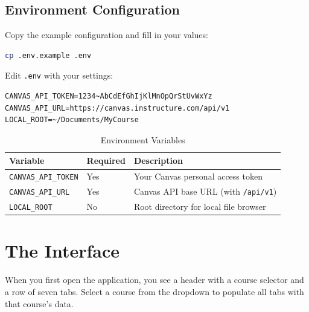 \documentclass[12pt,letterpaper]{article}
\begin{document}
\subsection{Environment Configuration}

Copy the example configuration and fill in your values:

\begin{lstlisting}[language=bash]
cp .env.example .env
\end{lstlisting}

Edit \texttt{.env} with your settings:

\begin{lstlisting}
CANVAS_API_TOKEN=1234~AbCdEfGhIjKlMnOpQrStUvWxYz
CANVAS_API_URL=https://canvas.instructure.com/api/v1
LOCAL_ROOT=~/Documents/MyCourse
\end{lstlisting}

\begin{table}[h]
\centering
\caption{Environment Variables}
\begin{tabular}{lll}
\toprule
\textbf{Variable} & \textbf{Required} & \textbf{Description} \\
\midrule
\texttt{CANVAS\_API\_TOKEN} & Yes & Your Canvas personal access token \\
\texttt{CANVAS\_API\_URL} & Yes & Canvas API base URL (with \texttt{/api/v1}) \\
\texttt{LOCAL\_ROOT} & No & Root directory for local file browser \\
\bottomrule
\end{tabular}
\end{table}


\section{The Interface}

When you first open the application, you see a header with a course selector and a row of seven tabs. Select a course from the dropdown to populate all tabs with that course's data.
\end{document}
